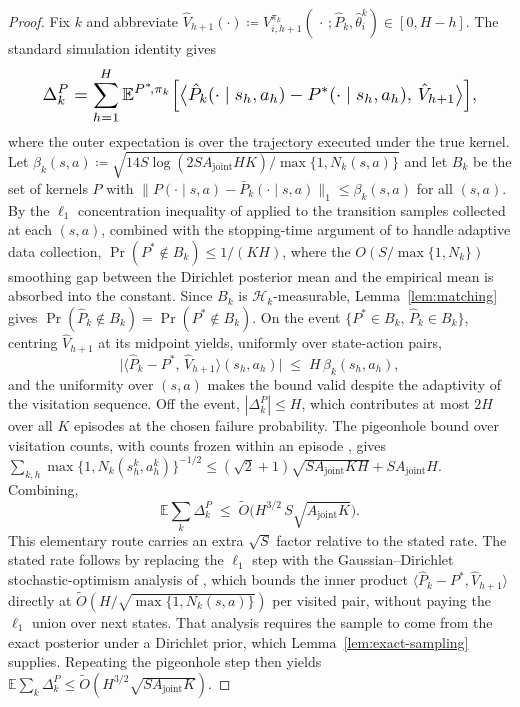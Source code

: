 \begin{proof}
Fix $k$ and abbreviate $\hat V_{h+1}(\cdot) \coloneqq V_{i,h+1}^{\pi_k}(\,\cdot\,; \hat P_k, \hat\theta_i^k) \in [0, H-h]$. The standard simulation identity \citep{osband2013more} gives
\begin{equation*}\resizebox{0.9\linewidth}{!}{$\displaystyle \Delta_k^P = \sum_{h=1}^{H} \mathbb{E}^{P^*\!,\pi_k}\Big[\big\langle \hat P_k(\cdot\mid s_h, a_h) - P^*(\cdot\mid s_h, a_h),\, \hat V_{h+1}\big\rangle\Big], $}\end{equation*}
where the outer expectation is over the trajectory executed under the true kernel. Let $\beta_k(s,a) \coloneqq \sqrt{14 S \log(2 S A_{\mathrm{joint}} H K)/\max\{1, N_k(s,a)\}}$ and let $B_k$ be the set of kernels $P$ with $\|P(\cdot\mid s,a) - \bar P_k(\cdot\mid s,a)\|_1 \le \beta_k(s,a)$ for all $(s,a)$. By the $\ell_1$ concentration inequality of \citet{weissman2003inequalities} applied to the transition samples collected at each $(s,a)$, combined with the stopping-time argument of \citet{auer2008near} to handle adaptive data collection, $\Pr(P^* \notin B_k) \le 1/(KH)$, where the $O(S/\max\{1,N_k\})$ smoothing gap between the Dirichlet posterior mean and the empirical mean is absorbed into the constant. Since $B_k$ is $\mathcal H_k$-measurable, Lemma~\ref{lem:matching} gives $\Pr(\hat P_k \notin B_k) = \Pr(P^* \notin B_k)$. On the event $\{P^* \in B_k,\, \hat P_k \in B_k\}$, centring $\hat V_{h+1}$ at its midpoint yields, uniformly over state-action pairs,
\begin{equation*}
\big|\langle \hat P_k - P^*,\, \hat V_{h+1}\rangle(s_h,a_h)\big| \;\le\; H\,\beta_k(s_h, a_h),
\end{equation*}
and the uniformity over $(s,a)$ makes the bound valid despite the adaptivity of the visitation sequence. Off the event, $|\Delta_k^P| \le H$, which contributes at most $2H$ over all $K$ episodes at the chosen failure probability. The pigeonhole bound over visitation counts, with counts frozen within an episode \citep{auer2008near,osband2013more}, gives $\sum_{k,h} \max\{1, N_k(s_h^k, a_h^k)\}^{-1/2} \le (\sqrt 2 + 1)\sqrt{S A_{\mathrm{joint}} K H} + S A_{\mathrm{joint}} H$. Combining,
\begin{equation*}
\mathbb{E}\sum_k \Delta_k^P \;\le\; \tilde O\big(H^{3/2}\, S \sqrt{A_{\mathrm{joint}} K}\big).
\end{equation*}
This elementary route carries an extra $\sqrt S$ factor relative to the stated rate. The stated rate follows by replacing the $\ell_1$ step with the Gaussian--Dirichlet stochastic-optimism analysis of \citet{osband2017posterior}, which bounds the inner product $\langle \hat P_k - P^*, \hat V_{h+1}\rangle$ directly at $\tilde O(H/\sqrt{\max\{1, N_k(s,a)\}})$ per visited pair, without paying the $\ell_1$ union over next states. That analysis requires the sample to come from the exact posterior under a Dirichlet prior, which Lemma~\ref{lem:exact-sampling} supplies. Repeating the pigeonhole step then yields $\mathbb{E}\sum_k \Delta_k^P \le \tilde O(H^{3/2}\sqrt{S A_{\mathrm{joint}} K})$.
\end{proof}

